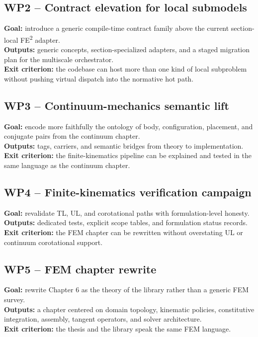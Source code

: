 \subsection*{WP2 -- Contract elevation for local submodels}
\textbf{Goal:} introduce a generic compile-time contract family above the
current section-local FE\textsuperscript{2} adapter. \\
\textbf{Outputs:} generic concepts, section-specialized adapters, and a staged
migration plan for the multiscale orchestrator. \\
\textbf{Exit criterion:} the codebase can host more than one kind of local
subproblem without pushing virtual dispatch into the normative hot path.

\subsection*{WP3 -- Continuum-mechanics semantic lift}
\textbf{Goal:} encode more faithfully the ontology of body, configuration,
placement, and conjugate pairs from the continuum chapter. \\
\textbf{Outputs:} tags, carriers, and semantic bridges from theory to
implementation. \\
\textbf{Exit criterion:} the finite-kinematics pipeline can be explained and
tested in the same language as the continuum chapter.

\subsection*{WP4 -- Finite-kinematics verification campaign}
\textbf{Goal:} revalidate TL, UL, and corotational paths with formulation-level
honesty. \\
\textbf{Outputs:} dedicated tests, explicit scope tables, and formulation
status records. \\
\textbf{Exit criterion:} the FEM chapter can be rewritten without overstating
UL or continuum corotational support.

\subsection*{WP5 -- FEM chapter rewrite}
\textbf{Goal:} rewrite Chapter 6 as the theory of the library rather than a
generic FEM survey. \\
\textbf{Outputs:} a chapter centered on domain topology, kinematic policies,
constitutive integration, assembly, tangent operators, and solver architecture. \\
\textbf{Exit criterion:} the thesis and the library speak the same FEM
language.

